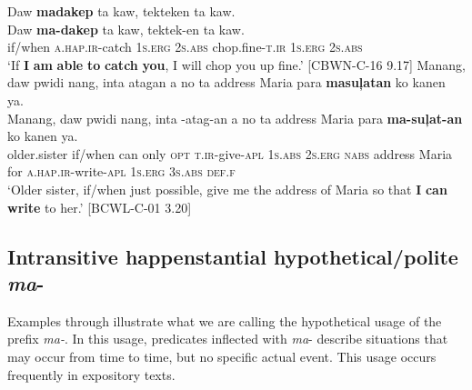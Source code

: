 \ea
\label{bkm:Ref448320715}
Daw  \textbf{madakep}  ta  kaw,  tekteken  ta  kaw. \\\smallskip
 \gll Daw  \textbf{ma-dakep}  ta  kaw,  tektek-en  ta  kaw. \\
if/when  \textsc{a.hap.ir}-catch  1\textsc{s.erg} 2\textsc{s.abs}  chop.fine-\textsc{t.ir} 1\textsc{s.erg}  2\textsc{s.abs} \\
\glt ‘If \textbf{I} \textbf{am} \textbf{able} \textbf{to} \textbf{catch} \textbf{you}, I will chop you up fine.’ [CBWN-C-16 9.17]
\z
\ea
\label{bkm:Ref123671980}
Manang,  daw  pwidi  nang,  inta  atagan  a  no  ta address  Maria  para  \textbf{masuļatan}  ko  kanen  ya. \\\smallskip
 \gll Manang,  daw  pwidi  nang,  inta  \emptyset{}-atag-an  a  no  ta address  Maria  para  \textbf{ma-suļat-an}  ko  kanen  ya. \\
older.sister  if/when  can  only  \textsc{opt}  \textsc{t.ir}-give-\textsc{apl}  1\textsc{s.abs} 2\textsc{s.erg}  \textsc{nabs}
address  Maria  for \textsc{a.hap.ir}-write-\textsc{apl}  1\textsc{s.erg}  3\textsc{s.abs}  \textsc{def.f} \\
\glt `Older sister, if/when just possible, give me the address of Maria so that \textbf{I} \textbf{can} \textbf{write} to her.’ [BCWL-C-01 3.20]
\z

\subsection{Intransitive happenstantial hypothetical/polite \textit{ma}{}-}
\label{bkm:Ref125306312}\label{bkm:Ref125306276}\label{bkm:Ref125306234}

Examples  through  illustrate what we are calling the hypothetical usage of the prefix \textit{ma-}. In this usage, predicates inflected with \textit{ma}{}- describe situations that may occur from time to time, but no specific actual event. This usage occurs frequently in expository texts.

